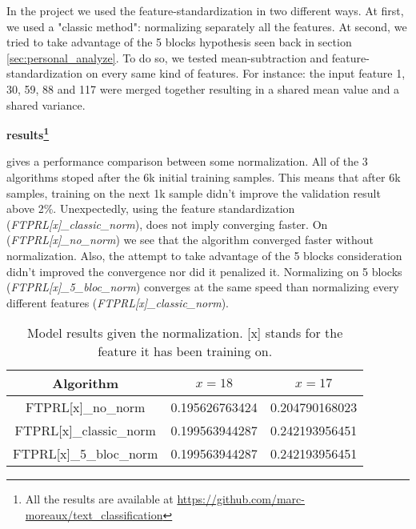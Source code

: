 		In the project we used the feature-standardization in two different ways. At first, we used a "classic method": normalizing separately all the features. At second, we tried to take advantage of the 5 blocks hypothesis seen back in section \ref{sec:personal_analyze}. To do so, we tested mean-subtraction and feature-standardization on every same kind of features. For instance: the input feature 1, 30, 59, 88 and 117 were merged together resulting in a shared mean value and a shared variance.

		\vspace{\baselineskip}
		\textbf{results\footnote{All the results are available at \url{https://github.com/marc-moreaux/text_classification}}}

		 gives a performance comparison between some normalization. All of the 3 algorithms stoped after the 6k initial training samples. This means that after 6k samples, training on the next 1k sample didn't improve the validation result above 2\%. Unexpectedly, using the feature standardization (\textit{FTPRL[x]\_classic\_norm}), does not imply converging faster. On (\textit{FTPRL[x]\_no\_norm}) we see that the algorithm converged faster without normalization. Also, the attempt to take advantage of the 5 blocks consideration didn't improved the convergence nor did it penalized it. Normalizing on 5 blocks (\textit{FTPRL[x]\_5\_bloc\_norm}) converges at the same speed than normalizing every different features (\textit{FTPRL[x]\_classic\_norm}).


		\begin{table}
			\centering
			\begin{tabular}{c|c|c}
				Algorithm 			 & $x=18$ & $x=17$ \\
				\hline
				FTPRL[x]\_no\_norm		& 0.195626763424 & 0.204790168023 \\
				FTPRL[x]\_classic\_norm	& 0.199563944287 & 0.242193956451 \\
				FTPRL[x]\_5\_bloc\_norm	& 0.199563944287 & 0.242193956451 \\
			\end{tabular}
			\caption{Model results given the normalization. [x] stands for the feature it has been training on.}
			\label{tab:normalization}
		\end{table}

